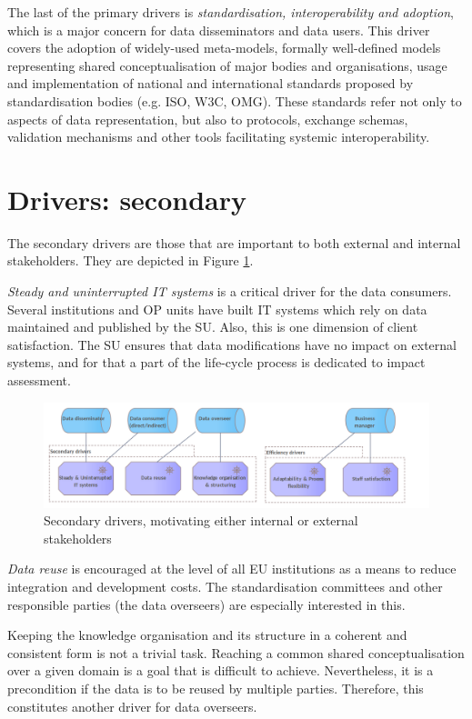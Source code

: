 	The last of the primary drivers is \textit{standardisation, interoperability and adoption}, which is a major concern for data disseminators and data users. This driver covers the adoption of widely-used meta-models, formally well-defined models representing shared conceptualisation of major bodies and organisations, usage and implementation of national and international standards proposed by standardisation bodies (e.g. ISO, W3C, OMG). These standards refer not only to aspects of data representation, but also to protocols, exchange schemas, validation mechanisms and other tools facilitating systemic interoperability. 
	
	\section{Drivers: secondary}
	The secondary drivers are those that are important to both external and internal stakeholders. They are depicted in Figure \ref{fig:secondary drivers}.

	\textit{Steady and uninterrupted IT systems} is a critical driver for the data consumers. Several institutions and OP units have built IT systems which rely on data maintained and published by the SU. Also, this is one dimension of client satisfaction. The SU ensures that data modifications have no impact on external systems, and for that a part of the life-cycle process is dedicated to impact assessment. 
	
	\begin{figure}[h]
		\centering
		\includegraphics[width=1.05\textwidth]{images/motivation/Secondary drivers.png}
		\caption{Secondary drivers, motivating either internal or external stakeholders}
		\label{fig:secondary drivers}
	\end{figure}
	
	\textit{Data reuse} is encouraged at the level of all EU institutions as a means to reduce integration and development costs. The standardisation committees and other responsible parties (the data overseers) are especially interested in this. 
	
	Keeping the knowledge organisation and its structure in a coherent and consistent form is not a trivial task. Reaching a common shared conceptualisation over a given domain is a goal that is difficult to achieve. Nevertheless, it is a precondition if the data is to be reused by multiple parties. Therefore, this constitutes another driver for data overseers. 
	
